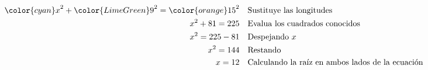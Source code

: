\begin{minipage}[t][][t]{0.65\textwidth}
\begin{solutionbox}{9.5cm}
\begin{align*}
            {\color{cyan}x}^2+{\color{LimeGreen}9}^2  ={\color{orange}15}^2 & \text{\quad Sustituye las longitudes}                         \\
            x^2+81   =225                                                   & \text{\quad Evalua los cuadrados conocidos}                   \\
            x^2=225-81                                                      & \text{\quad Despejando } x                                    \\
            x^2=144                                                         & \text{\quad Restando}                                         \\
            x=12                                                            & \text{\quad Calculando la raíz en ambos lados de la ecuación} \\
        \end{align*}
    \end{solutionbox}
\end{minipage}

